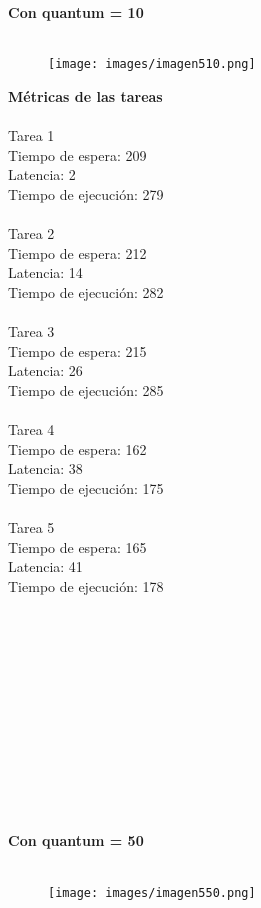 {\bf Con quantum = 10}\\\\
\begin{figure}[h]
  \centering
    \texttt{[image: images/imagen510.png]}
  \label{fig:imagen5_10}
\end{figure}

{\bf Métricas de las tareas}\\\\
Tarea 1\\
Tiempo de espera: 209\\
Latencia: 2\\
Tiempo de ejecución: 279\\\\
Tarea 2\\
Tiempo de espera: 212\\
Latencia: 14\\
Tiempo de ejecución: 282\\\\
Tarea 3\\
Tiempo de espera: 215\\
Latencia: 26\\
Tiempo de ejecución: 285\\\\
Tarea 4\\
Tiempo de espera: 162\\
Latencia: 38\\
Tiempo de ejecución: 175\\\\
Tarea 5\\
Tiempo de espera: 165\\
Latencia: 41\\
Tiempo de ejecución: 178\\\\\\\\\\\\\\\\\\\\\\\\\\

{\bf Con quantum = 50}\\\\
\begin{figure}[h]
  \centering
    \texttt{[image: images/imagen550.png]}
  \label{fig:imagen5_50}
\end{figure}

